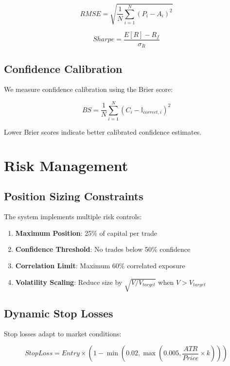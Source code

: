 \documentclass[12pt,a4paper]{article}
\begin{document}
\begin{equation}
RMSE = \sqrt{\frac{1}{N} \sum_{i=1}^{N} (P_i - A_i)^2}
\end{equation}

\begin{equation}
Sharpe = \frac{E[R] - R_f}{\sigma_R}
\end{equation}

\subsection{Confidence Calibration}

We measure confidence calibration using the Brier score:

\begin{equation}
BS = \frac{1}{N} \sum_{i=1}^{N} (C_i - \mathbb{I}_{correct,i})^2
\end{equation}

Lower Brier scores indicate better calibrated confidence estimates.

\section{Risk Management}

\subsection{Position Sizing Constraints}

The system implements multiple risk controls:

\begin{enumerate}
    \item \textbf{Maximum Position}: 25\% of capital per trade
    \item \textbf{Confidence Threshold}: No trades below 50\% confidence
    \item \textbf{Correlation Limit}: Maximum 60\% correlated exposure
    \item \textbf{Volatility Scaling}: Reduce size by $\sqrt{V/V_{target}}$ when $V > V_{target}$
\end{enumerate}

\subsection{Dynamic Stop Losses}

Stop losses adapt to market conditions:

\begin{equation}
StopLoss = Entry \times \left(1 - \min\left(0.02, \max\left(0.005, \frac{ATR}{Price} \times k\right)\right)\right)
\end{equation}
\end{document}
